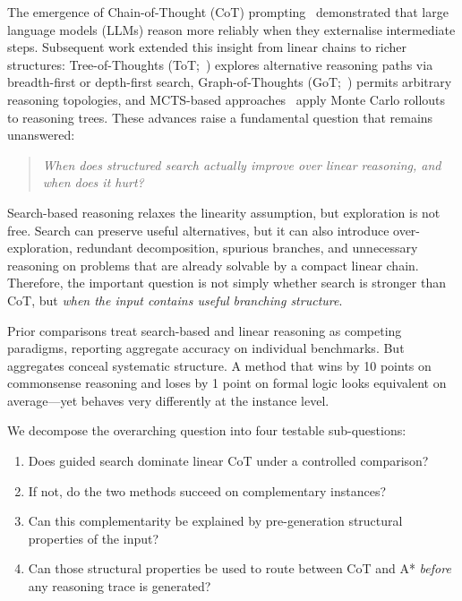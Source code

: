 \documentclass{article}
\begin{document}
The emergence of Chain-of-Thought (CoT) prompting~\citep{wei2022chain}
demonstrated that large language models (LLMs) reason more reliably when they
externalise intermediate steps.  Subsequent work extended this insight from
linear chains to richer structures: Tree-of-Thoughts
(ToT;~\citealt{yao2024tree}) explores alternative reasoning paths via
breadth-first or depth-first search, Graph-of-Thoughts
(GoT;~\citealt{besta2024graph}) permits arbitrary reasoning topologies, and
MCTS-based approaches~\citep{hao2023reasoning} apply Monte Carlo rollouts to
reasoning trees.  These advances raise a fundamental question that remains
unanswered:

\begin{quote}
\emph{When does structured search actually improve over linear reasoning, and
when does it hurt?}
\end{quote}

Search-based reasoning relaxes the linearity assumption, but exploration is not
free.  Search can preserve useful alternatives, but it can also introduce
over-exploration, redundant decomposition, spurious branches, and unnecessary
reasoning on problems that are already solvable by a compact linear chain.
Therefore, the important question is not simply whether search is stronger than
CoT, but \emph{when the input contains useful branching structure}.

Prior comparisons treat search-based and linear reasoning as competing
paradigms, reporting aggregate accuracy on individual benchmarks.  But
aggregates conceal systematic structure.  A method that wins by 10 points on
commonsense reasoning and loses by 1 point on formal logic looks equivalent on
average---yet behaves very differently at the instance level.

We decompose the overarching question into four testable sub-questions:
\begin{enumerate}[leftmargin=2em,itemsep=2pt,label=(\roman*)]
\item Does guided search dominate linear CoT under a controlled comparison?
\item If not, do the two methods succeed on complementary instances?
\item Can this complementarity be explained by pre-generation structural
  properties of the input?
\item Can those structural properties be used to route between CoT and A*
  \emph{before} any reasoning trace is generated?
\end{enumerate}
\end{document}
